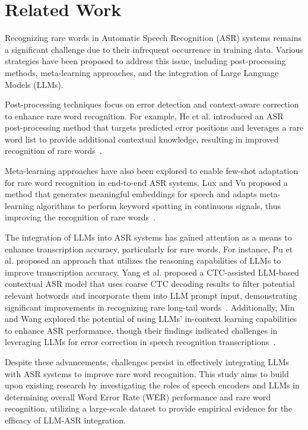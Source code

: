 \section{Related Work}
\label{sec:related}

Recognizing rare words in Automatic Speech Recognition (ASR) systems remains a significant challenge due to their infrequent occurrence in training data. Various strategies have been proposed to address this issue, including post-processing methods, meta-learning approaches, and the integration of Large Language Models (LLMs).

Post-processing techniques focus on error detection and context-aware correction to enhance rare word recognition. For example, He et al. introduced an ASR post-processing method that targets predicted error positions and leverages a rare word list to provide additional contextual knowledge, resulting in improved recognition of rare words~\cite{he2023edcec}.

Meta-learning approaches have also been explored to enable few-shot adaptation for rare word recognition in end-to-end ASR systems. Lux and Vu proposed a method that generates meaningful embeddings for speech and adapts meta-learning algorithms to perform keyword spotting in continuous signals, thus improving the recognition of rare words~\cite{lux2021metalearning}.

The integration of LLMs into ASR systems has gained attention as a means to enhance transcription accuracy, particularly for rare words. For instance, Pu et al. \cite{pu2023multistage} proposed an approach that utilizes the reasoning capabilities of LLMs to improve transcription accuracy. Yang et al. proposed a CTC-assisted LLM-based contextual ASR model that uses coarse CTC decoding results to filter potential relevant hotwords and incorporate them into LLM prompt input, demonstrating significant improvements in recognizing rare long-tail words~\cite{yang2024ctcassisted}. Additionally, Min and Wang explored the potential of using LLMs' in-context learning capabilities to enhance ASR performance, though their findings indicated challenges in leveraging LLMs for error correction in speech recognition transcriptions~\cite{min2023exploring}.

Despite these advancements, challenges persist in effectively integrating LLMs with ASR systems to improve rare word recognition. This study aims to build upon existing research by investigating the roles of speech encoders and LLMs in determining overall Word Error Rate (WER) performance and rare word recognition, utilizing a large-scale dataset to provide empirical evidence for the efficacy of LLM-ASR integration.